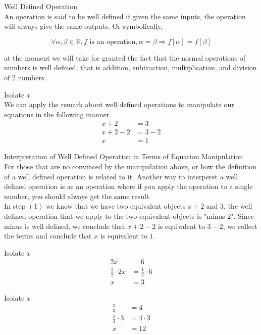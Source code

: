\documentclass{book}
\begin{document}
  {\remark Well Defined Operation \\
     An operation is said to be well defined if given the same inputs, the operation will always give the same outputs. Or symbolically,

    $$\forall \alpha, \beta \in \mathbb{R}, f \text{ is an operation}, \alpha = \beta \Rightarrow f[\alpha] = f[\beta]$$

     at the moment we will take for granted the fact that the normal operations of numbers is well defined, that is addition, subtraction, multiplication, and division of 2 numbers.\\
  }

  {\example Isolate $x$ \\
     We can apply the remark about well defined operations to manipulate our equations in the following manner.
    \begin{align}
      x + 2 & = 3\\
      x + 2 - 2 & = 3 - 2\\
      x & = 1
    \end{align}
  }

  {\remark Interpretation of Well Defined Operation in Terms of Equation Manipulation \\
    For those that are no convinced by the manipulation above, or how the definition of a well defined operation is related to it. Another way to interperet a well defined operation is as an operation where if you apply the operation to a single number, you should always get the same result.\\

     In step $(1)$ we know that we have two equivalent objects $x + 2$ and $3$, the well defined operation that we apply to the two equivalent objects is "minus 2". Since minus is well defined, we conclude that $x + 2 - 2$ is equivalent to $3 - 2$, we collect the terms and conclude that $x$ is equivalent to $1$.\\
  }

  {\example Isolate $x$ \\
    \begin{align*}
      2x & = 6\\
      \frac{1}{2} \cdot 2x & = \frac{1}{2} \cdot 6\\
      x & = 3
    \end{align*}
  }

  {\example Isolate $x$ \\
    \begin{align*}
      \frac{x}{3} & = 4\\
      \frac{x}{3} \cdot 3 & = 4 \cdot 3\\
      x & = 12
    \end{align*}
  }
\end{document}
